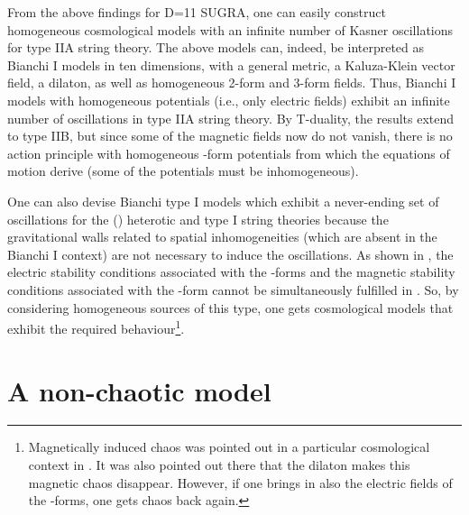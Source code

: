 \documentclass[a4paper,12pt]{article}
\begin{document}
{}From the above findings for D=11 SUGRA, one can easily 
construct homogeneous cosmological models with an
infinite number of Kasner oscillations for type IIA string
theory.  The above models can, indeed, be interpreted
as Bianchi I models in ten dimensions, with a general
metric, a Kaluza-Klein vector field, a dilaton, as well as
homogeneous 2-form and 3-form fields.  Thus, Bianchi I
models with homogeneous potentials (i.e., only electric fields) 
exhibit an infinite number of oscillations in type IIA string theory.
By T-duality, the results extend to type IIB, but since some of the
magnetic fields now do not vanish, there is no
action principle with homogeneous \coordHE{}-form potentials
from which the equations of motion derive (some of the potentials
must be inhomogeneous).

One can also devise Bianchi type I models which exhibit
a never-ending set of oscillations for the (\coordHE{}) heterotic and
type I string theories because the gravitational walls
related to spatial inhomogeneities (which are absent in
the Bianchi I context) are not necessary to induce the oscillations.
As shown in \cite{dh2}, the electric stability conditions associated with
the \coordHE{}-forms and the magnetic stability conditions associated
with the \coordHE{}-form cannot be simultaneously fulfilled in \coordHE{}.
So, by considering homogeneous sources
of this type, one gets cosmological models that exhibit the required
behaviour\footnote{Magnetically induced chaos was pointed out in a particular
cosmological context in \cite{Moorhouse}.  It was
also pointed out there that the dilaton makes this magnetic chaos
disappear.  However, if one brings in also the electric fields of
the \coordHE{}-forms, one gets chaos back again.}.


\section{A non-chaotic model}
\end{document}
